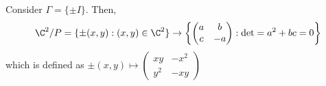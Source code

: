\begin{eg}
  Consider $\Gamma = \{\pm I\}$. Then,
  $$ \C^2 / P = \{\pm(x, y) : (x, y) \in \C^2\} \to \left\{\begin{pmatrix}
    a & b \\ c & -a
  \end{pmatrix} : \det = a^2 + bc = 0\right\}$$
  which is defined as $\pm (x, y) \mapsto \begin{pmatrix}
    xy & -x^2 \\ y^2 & -xy
  \end{pmatrix}$
\end{eg}
\begin{figure}[!ht]
\centering
\resizebox{0.3\textwidth}{!}{}
\caption{}
\end{figure}

